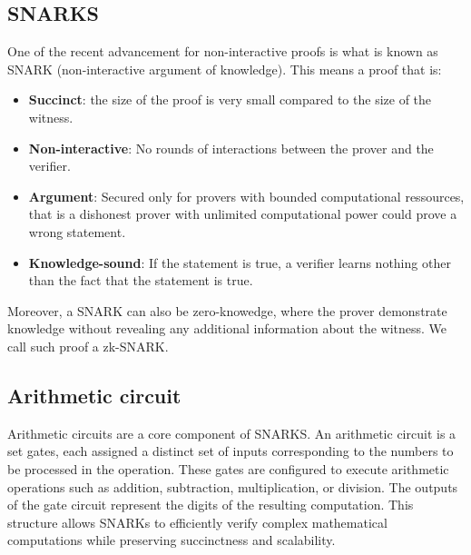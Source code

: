  \subsection{SNARKS} 
One of the recent advancement for non-interactive proofs is what is known as SNARK (non-interactive argument of knowledge).
This means a proof that is:
\begin{itemize}

    \item \textbf{Succinct}: the size of the proof is very small compared to the size of the witness.
    
    \item \textbf{Non-interactive}: No rounds of interactions between the prover and the verifier.

    \item \textbf{Argument}: Secured only for provers with bounded computational ressources, that is a dishonest prover with unlimited computational power could prove a wrong statement.

    \item \textbf{Knowledge-sound}: If the statement is true,  a verifier learns nothing other than the fact that the statement is true. \cite{NZ20}
    
    \end{itemize}

Moreover, a SNARK can also be zero-knowedge, where the prover demonstrate knowledge without revealing any additional information about the witness. We call such proof a zk-SNARK.

\subsection{Arithmetic circuit} 



Arithmetic circuits are a core component of SNARKS. An arithmetic circuit is a set gates, each assigned a distinct set of inputs corresponding to the numbers to be processed in the operation. 
These gates are configured to execute arithmetic operations such as addition, subtraction, multiplication, or division. The outputs of the gate circuit represent the digits of the resulting computation.
This structure allows SNARKs to efficiently verify complex mathematical computations while preserving succinctness and scalability.

